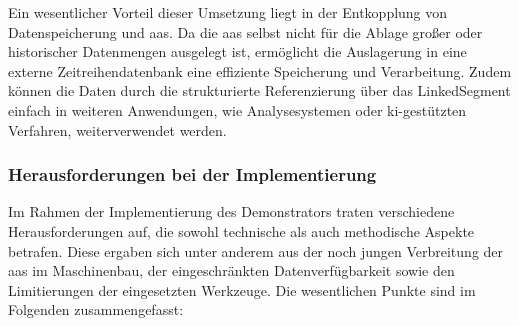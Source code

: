 Ein wesentlicher Vorteil dieser Umsetzung liegt in der Entkopplung von Datenspeicherung und \acs{aas}. 
Da die \acs{aas} selbst nicht für die Ablage großer oder historischer Datenmengen ausgelegt ist, ermöglicht die Auslagerung in eine externe Zeitreihendatenbank eine effiziente Speicherung und Verarbeitung. 
Zudem können die Daten durch die strukturierte Referenzierung über das LinkedSegment einfach in weiteren Anwendungen, wie Analysesystemen oder \acs{ki}-gestützten Verfahren, weiterverwendet werden.

\subsubsection{Herausforderungen bei der Implementierung}
Im Rahmen der Implementierung des Demonstrators traten verschiedene Herausforderungen auf, die sowohl technische als auch methodische Aspekte betrafen. 
Diese ergaben sich unter anderem aus der noch jungen Verbreitung der \acs{aas} im Maschinenbau, der eingeschränkten Datenverfügbarkeit sowie den Limitierungen der eingesetzten Werkzeuge. 
Die wesentlichen Punkte sind im Folgenden zusammengefasst:

